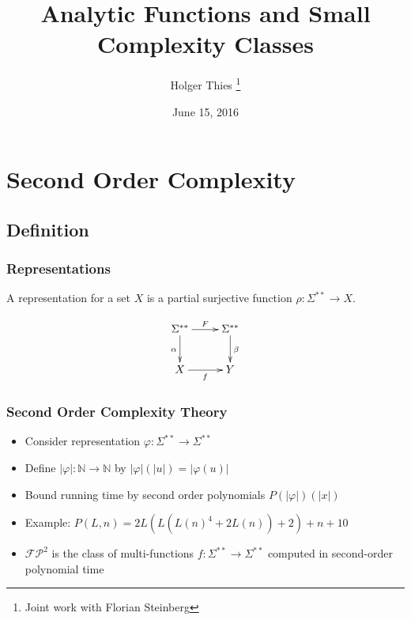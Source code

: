 \documentclass[xcolor=pdftex,dvipsnames,table,handout]{beamer}
\title[Analytic Functions]{Analytic Functions and Small Complexity Classes}
\author[ H. Thies]{
		Holger Thies \footnote{Joint work with Florian Steinberg}
}
\institute[The University of Tokyo]{
  The University of Tokyo
}
\newcommand{\N}{\ensuremath{\mathbb{N}}}
\newcommand{\sigmas}{\ensuremath{\Sigma^{**}}}
\newcommand{\abs}[1]{\left|#1\right|}
\newcommand{\fpt}{\ensuremath{\mathcal{FP}^2}\xspace}
\begin{document}
\date{June 15, 2016}
\frame{
\titlepage
}
\section{Second Order Complexity}
\subsection{Definition}
\begin{frame}
  \frametitle{Representations}
  A representation for a set $X$ is a partial surjective function $\rho: \Sigma^{**} \to X$.
  \pause
  \vfill
  \begin{minipage}{.37\textwidth}
  \begin{displaymath}
    \xymatrix{
        \Sigma^{**} \ar[r]^F \ar[d]_\alpha & \Sigma^{**} \ar[d]^{\beta} \\
        X \ar[r]_{f}       & Y }
  \end{displaymath} 
  \end{minipage}
  \hfill
  \pause
  \begin{minipage}{.45\textwidth}
  \end{minipage}
  \end{frame}
\begin{frame}
  \frametitle{Second Order Complexity Theory}
  \begin{itemize}
  \item Consider representation $\varphi : \sigmas \to \sigmas$
  \item Define $\abs{\varphi} : \N \to \N$ by $\abs{\varphi}(\abs{u}) = \abs{\varphi(u)}$
   \item Bound running time by second order polynomials $P(\abs{\varphi})(\abs{x})$
   \item Example: $P(L,n) = 2L(L(L(n)^4+2L(n))+2)+n+10$
   \item \fpt is the class of multi-functions $f: \sigmas \to \sigmas$ computed in second-order polynomial time
  \end{itemize}
\end{frame}
\end{document}
